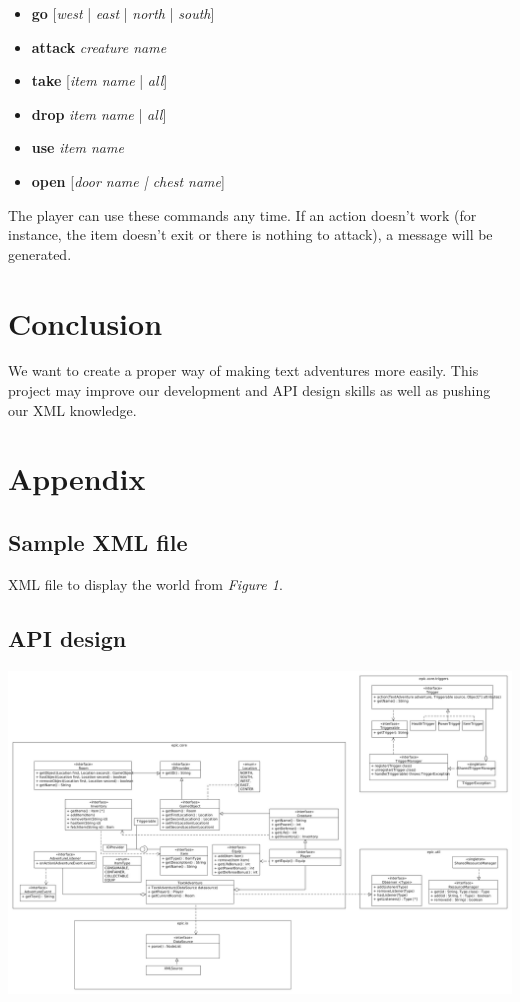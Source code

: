 \documentclass[dvips,12pt]{article}
\begin{document}
\begin{itemize}
	\item{\textbf{go} [\emph{west} | \emph{east} | \emph{north} | \emph{south}]}
	\item{\textbf{attack} \emph{creature name}}
	\item{\textbf{take} [\emph{item name} | \emph{all}]}
	\item{\textbf{drop} \emph{item name} | \emph{all}]}
	\item{\textbf{use} \emph{item name}}
	\item{\textbf{open} [\emph{\emph{door name} | \emph{chest name}}]}
\end{itemize}

The player can use these commands any time. If an action doesn't work (for instance, the item doesn't exit or there is nothing to attack), a message will be generated.

\section{Conclusion}

We want to create a proper way of making text adventures more easily. This project may improve our development and API design skills as well as pushing our XML knowledge.

\section{Appendix}

\label{App:xml}

\subsection{Sample XML file}


XML file to display the world from \emph{Figure 1}.


\subsection{API design}
\includegraphics[width=6.5in]{assets/class-diagram.png}
\end{document}
